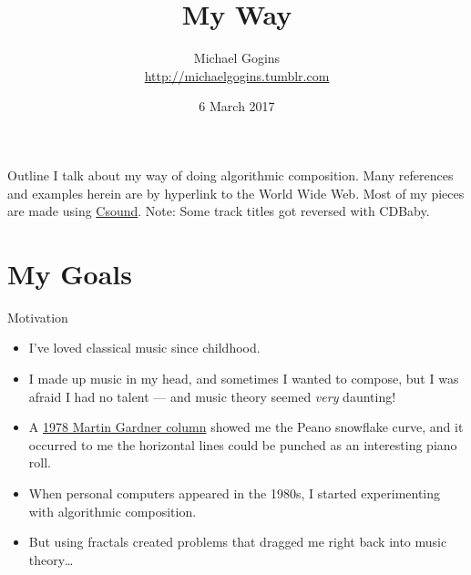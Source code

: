 \documentclass{beamer}
\title[My Way] %
{My Way}
\author[Gogins] %
{Michael Gogins \\ \url{http://michaelgogins.tumblr.com} }
\institute[Irreducible Productions] %
{
  Irreducible Productions\\
  New York
}
\date[6 March 2017] %
{6 March 2017}
\begin{document}

\begin{frame}
  \titlepage
\end{frame}

\begin{frame}{Outline}
	I talk about my way of doing algorithmic composition. Many references and examples herein are by hyperlink to the World Wide Web. Most of my pieces are made using \href{http://csound.github.io/}{Csound}. Note: Some track titles got reversed with CDBaby.
  \tableofcontents
\end{frame}

\section{My Goals}

\begin{frame}{Motivation}
	\begin{itemize}
		\item
			I've loved classical music since childhood.
		\item
			I made up music in my head, and sometimes I wanted to compose, but I was afraid I had no talent --- and music theory seemed \emph{very} daunting! 
		\item
			A \href{http://labs.la.utexas.edu/gilden/files/2016/04/Gardner-WhiteBrownFractalMusic.pdf}{1978 Martin Gardner column} showed me the Peano snowflake curve, and it occurred to me the horizontal lines could be punched as an interesting piano roll. 
		\item
			When personal computers appeared in the 1980s, I started experimenting with algorithmic composition.
		\item
			But using fractals created problems that dragged me right back into music theory\dots
	\end{itemize}
\end{frame}
\end{document}
